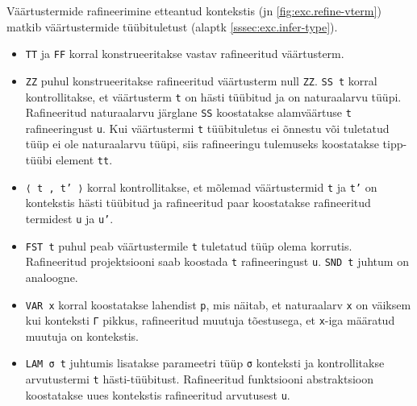 \documentclass[a4paper,12pt]{article}
\begin{document}
Väärtustermide rafineerimine etteantud kontekstis (jn \ref{fig:exc.refine-vterm}) matkib väärtustermide tüübituletust (alaptk \ref{sssec:exc.infer-type}).
\begin{itemize}
\item {\tt TT} ja {\tt FF} korral konstrueeritakse vastav rafineeritud väärtusterm.
\item {\tt ZZ} puhul konstrueeritakse rafineeritud väärtusterm null {\tt ZZ}. {\tt SS t} korral kontrollitakse, et väärtusterm {\tt t} on hästi tüübitud ja on naturaalarvu tüüpi. Rafineeritud naturaalarvu järglane {\tt SS} koostatakse alamväärtuse {\tt t} rafineeringust {\tt u}. Kui väärtustermi {\tt t} tüübituletus ei õnnestu või tuletatud tüüp ei ole naturaalarvu tüüpi, siis rafineeringu tulemuseks koostatakse tipp-tüübi element {\tt tt}.
\item {\tt ⟨ t , t' ⟩} korral kontrollitakse, et mõlemad väärtustermid {\tt t} ja {\tt t'} on kontekstis hästi tüübitud ja rafineeritud paar koostatakse rafineeritud termidest {\tt u} ja {\tt u'}.
\item {\tt FST t} puhul peab väärtustermile {\tt t} tuletatud tüüp olema korrutis. Rafineeritud projektsiooni saab koostada {\tt t} rafineeringust {\tt u}. {\tt SND t} juhtum on analoogne.
\item {\tt VAR x} korral koostatakse lahendist {\tt p}, mis näitab, et naturaalarv {\tt x} on väiksem kui konteksti {\tt Γ} pikkus, rafineeritud muutuja tõestusega, et {\tt x}-iga määratud muutuja on kontekstis.
\item {\tt LAM σ t} juhtumis lisatakse parameetri tüüp {\tt σ} konteksti ja kontrollitakse arvutustermi {\tt t} hästi-tüübitust. Rafineeritud funktsiooni abstraktsioon koostatakse uues kontekstis rafineeritud arvutusest {\tt u}.
\end{itemize}
\end{document}
